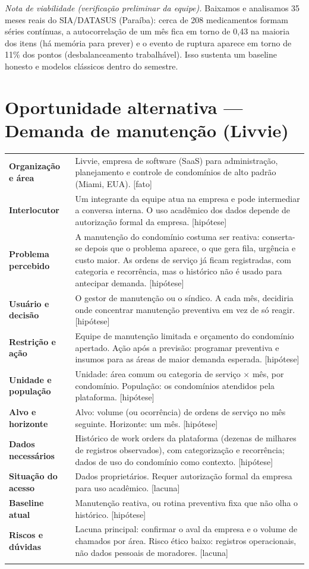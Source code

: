 \documentclass[11pt,a4paper]{article}
\newcommand{\campo}[2]{\textbf{#1} & #2 \\ \addlinespace[1pt]}
\newcommand{\fato}{\textcolor{azulmls}{\footnotesize[fato]}}
\newcommand{\hip}{\textcolor{cinzatexto}{\footnotesize[hipótese]}}
\newcommand{\lac}{\textcolor{cinzatexto}{\footnotesize[lacuna]}}
\begin{document}
\textit{Nota de viabilidade (verificação preliminar da equipe).} Baixamos e analisamos 35 meses reais do SIA/DATASUS (Paraíba): cerca de 208 medicamentos formam séries contínuas, a autocorrelação de um mês fica em torno de 0{,}43 na maioria dos itens (há memória para prever) e o evento de ruptura aparece em torno de 11\% dos pontos (desbalanceamento trabalhável). Isso sustenta um baseline honesto e modelos clássicos dentro do semestre.

\section{Oportunidade alternativa --- Demanda de manutenção (Livvie)}

\begin{tabularx}{\textwidth}{@{}L X@{}}
\toprule
\campo{Organização e área}{Livvie, empresa de software (SaaS) para administração, planejamento e controle de condomínios de alto padrão (Miami, EUA). \fato}
\campo{Interlocutor}{Um integrante da equipe atua na empresa e pode intermediar a conversa interna. O uso acadêmico dos dados depende de autorização formal da empresa. \hip}
\campo{Problema percebido}{A manutenção do condomínio costuma ser reativa: conserta-se depois que o problema aparece, o que gera fila, urgência e custo maior. As ordens de serviço já ficam registradas, com categoria e recorrência, mas o histórico não é usado para antecipar demanda. \hip}
\campo{Usuário e decisão}{O gestor de manutenção ou o síndico. A cada mês, decidiria onde concentrar manutenção preventiva em vez de só reagir. \hip}
\campo{Restrição e ação}{Equipe de manutenção limitada e orçamento do condomínio apertado. Ação após a previsão: programar preventiva e insumos para as áreas de maior demanda esperada. \hip}
\campo{Unidade e população}{Unidade: área comum ou categoria de serviço $\times$ mês, por condomínio. População: os condomínios atendidos pela plataforma. \hip}
\campo{Alvo e horizonte}{Alvo: volume (ou ocorrência) de ordens de serviço no mês seguinte. Horizonte: um mês. \hip}
\campo{Dados necessários}{Histórico de work orders da plataforma (dezenas de milhares de registros observados), com categorização e recorrência; dados de uso do condomínio como contexto. \hip}
\campo{Situação do acesso}{Dados proprietários. Requer autorização formal da empresa para uso acadêmico. \lac}
\campo{Baseline atual}{Manutenção reativa, ou rotina preventiva fixa que não olha o histórico. \hip}
\campo{Riscos e dúvidas}{Lacuna principal: confirmar o aval da empresa e o volume de chamados por área. Risco ético baixo: registros operacionais, não dados pessoais de moradores. \lac}
\bottomrule
\end{tabularx}
\end{document}
